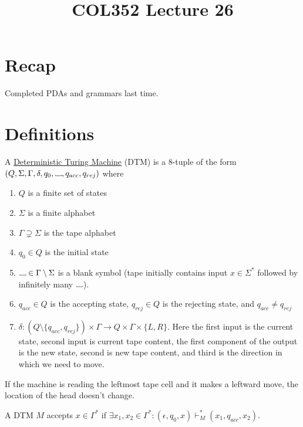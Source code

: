 \documentclass[a4paper]{article}
\title{\textbf{COL352 Lecture 26}}
\date{}
\newcommand{\changesto}{\vdash}
\newcommand\Vtextvisiblespace[1][.3em]{%
    \mbox{\kern.06em\vrule height.3ex}%
    \vbox{\hrule width#1}%
    \hbox{\vrule height.3ex}
}
\newcommand{\blank}{{\Vtextvisiblespace[0.7em]}}
\begin{document}
\maketitle
\tableofcontents

\section{Recap}

Completed PDAs and grammars last time.

\section{Definitions}

\begin{defn}
    A \underline{Deterministic Turing Machine} (DTM) is a 8-tuple of the form $(Q, \Sigma, \Gamma, \delta, q_0, \blank, q_{acc}, q_{rej})$ where
    \begin{enumerate}
        \item $Q$ is a finite set of states
        \item $\Sigma$ is a finite alphabet
        \item $\Gamma \supsetneq \Sigma$ is the tape alphabet
        \item $q_0 \in Q$ is the initial state
        \item $\blank \in \Gamma \setminus \Sigma$ is a blank symbol (tape initially contains input $x \in \Sigma^*$ followed by infinitely many $\blank$).
        \item $q_{acc} \in Q$ is the accepting state, $q_{rej} \in Q$ is the rejecting state, and $q_{acc} \ne q_{rej}$
        \item $\delta : (Q \setminus \{q_{acc}, q_{rej}\}) \times \Gamma \to Q \times \Gamma \times \{L, R\}$.
            Here the first input is the current state, second input is current tape content, the first component of the output is the new state, second is new tape content, and third is the
            direction in which we need to move.
    \end{enumerate}
    If the machine is reading the leftmost tape cell and it makes a leftward move, the location of the head doesn't change.
\end{defn}

\begin{defn}
    A DTM $M$ accepts $x \in \Gamma^*$ if $\exists x_1, x_2 \in \Gamma^* : (\epsilon, q_0, x) \changesto^*_M (x_1, q_{acc}, x_2)$.
\end{defn}
\end{document}
